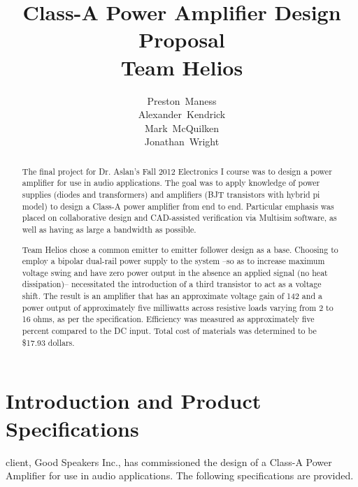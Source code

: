 \documentclass[journal]{IEEEtran}
\begin{document}
\title{Class-A Power Amplifier Design Proposal\\Team Helios}
\author{Preston~Maness\\Alexander~Kendrick\\Mark~McQuilken\\Jonathan~Wright}

%
{}

\maketitle

\begin{abstract}
The final project for Dr. Aslan's Fall 2012 Electronics I course was to design a power amplifier for use in audio applications. The goal was to apply knowledge of power supplies (diodes and transformers) and amplifiers (BJT transistors with hybrid pi model) to design a Class-A power amplifier from end to end. Particular emphasis was placed on collaborative design and CAD-assisted verification via Multisim software, as well as having as large a bandwidth as possible. 

Team Helios chose a common emitter to emitter follower design as a base. Choosing to employ a bipolar dual-rail power supply to the system --so as to increase maximum voltage swing and have zero power output in the absence an applied signal (no heat dissipation)-- necessitated the introduction of a third transistor to act as a voltage shift. The result is an amplifier that has an approximate voltage gain of 142 and a power output of approximately five milliwatts across resistive loads varying from 2 to 16 ohms, as per the specification. Efficiency was measured as approximately five percent compared to the DC input. Total cost of materials was determined to be \$17.93 dollars.
\end{abstract}

\tableofcontents
\listoffigures

\section{Introduction and Product Specifications}
 client, Good Speakers Inc., has commissioned the design of a Class-A Power Amplifier for use in audio applications. The following specifications are provided. 
\end{document}
